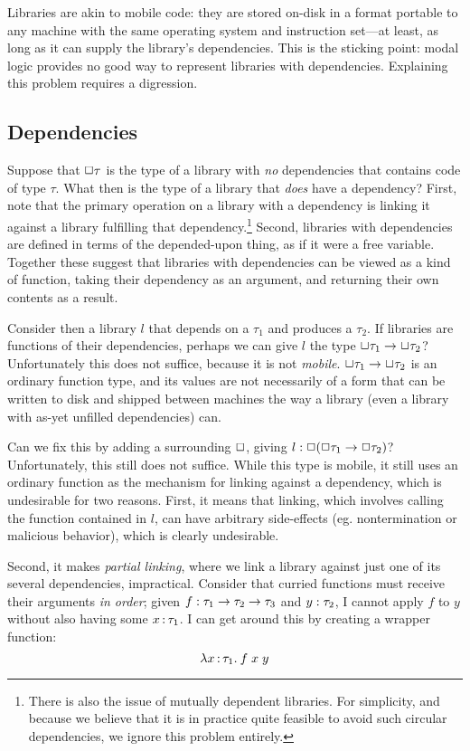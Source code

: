 \documentclass[11pt]{article}
\begin{document}
Libraries are akin to mobile code: they are stored on-disk in a format portable
to any machine with the same operating system and instruction set---at least, as
long as it can supply the library's dependencies. This is the sticking point:
modal logic provides no good way to represent libraries with dependencies.
Explaining this problem requires a digression.

\subsection{Dependencies}

Suppose that $\Box \tau$ is the type of a library with \emph{no} dependencies
that contains code of type $\tau$. What then is the type of a library that
\emph{does} have a dependency? First, note that the primary operation on a
library with a dependency is linking it against a library fulfilling that
dependency.\footnote{There is also the issue of mutually dependent libraries.
  For simplicity, and because we believe that it is in practice quite feasible
  to avoid such circular dependencies, we ignore this problem entirely.} Second,
libraries with dependencies are defined in terms of the depended-upon thing, as
if it were a free variable. Together these suggest that libraries with
dependencies can be viewed as a kind of function, taking their dependency as an
argument, and returning their own contents as a result.

Consider then a library $l$ that depends on a $\tau_1$ and produces a $\tau_2$.
If libraries are functions of their dependencies, perhaps we can give $l$ the
type $\Box \tau_1 \to \Box \tau_2$? Unfortunately this does not suffice, because
it is not \emph{mobile}. $\Box \tau_1 \to \Box \tau_2$ is an ordinary function
type, and its values are not necessarily of a form that can be written to disk
and shipped between machines the way a library (even a library with as-yet
unfilled dependencies) can.

Can we fix this by adding a surrounding $\Box$, giving $l : \Box(\Box \tau_1
\to \Box \tau_2)$? Unfortunately, this still does not suffice. While this type
is mobile, it still uses an ordinary function as the mechanism for linking
against a dependency, which is undesirable for two reasons. First, it means that
linking, which involves calling the function contained in $l$, can have
arbitrary side-effects (eg. nontermination or malicious behavior), which is
clearly undesirable.

Second, it makes \emph{partial linking}, where we link a library against just
one of its several dependencies, impractical. Consider that curried functions
must receive their arguments \emph{in order}; given $f : \tau_1 \to \tau_2
\to \tau_3$ and $y : \tau_2$, I cannot apply $f$ to $y$ without also having
some $x \mathop{:} \tau_1$. I can get around this by creating a wrapper function:
\[ \lambda x \mathop{:} \tau_1 .\: f \; x \; y \]
\end{document}
